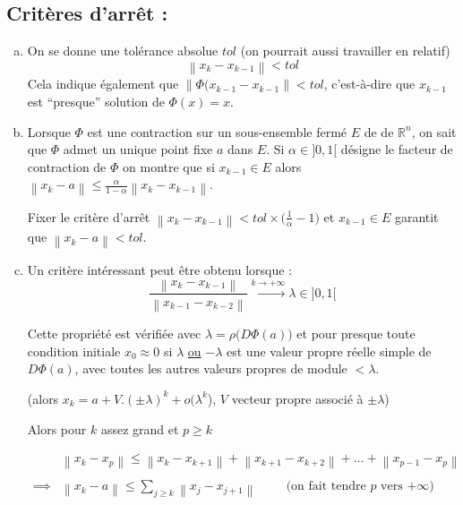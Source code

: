 \documentclass[a4paper,11pt]{article}
\newcommand{\R}{\mathbb{R}}
\newcommand{\norm}[1]{\left\lVert#1\right\rVert}
\theoremstyle{plain} %
\begin{document}
\subsection*{Critères d'arrêt :}
\begin{enumerate}[a)]
    \item
        On se donne une tolérance absolue $tol$ (on pourrait aussi travailler en relatif)
        \[
              \norm{x_k - x_{k-1}} < tol
        \]
        Cela indique également que $\norm{\Phi(x_{k-1} - x_{k-1}} < tol$,
        c'est-à-dire que $x_{k-1}$ est ``presque'' solution de $\Phi(x) = x$.
        
    \item Lorsque $\Phi$ est une contraction sur un sous-ensemble fermé $E$ de
          de $\R^n$, on sait que $\Phi$ admet un unique point fixe $a$ dans $E$.
          Si $\alpha \in ]0,1[$ désigne le facteur de contraction de $\Phi$ on
          montre que si $x_{k-1} \in E$ alors $\norm{x_k-a} \leq \frac{\alpha}{1-\alpha} \norm{x_k - x_{k-1}}$.
          
          Fixer le critère d'arrêt $\norm{x_k - x_{k-1}} < tol \times \big(\frac{1}{\alpha} - 1 \big)$ et $x_{k-1} \in E$ garantit que $\norm{x_k - a} < tol$.


    \item Un critère intéressant peut être obtenu lorsque :
        \[
        \frac{\norm{x_k - x_{k-1}}}{\norm{x_{k-1}-x_{k-2}}} \xrightarrow{k\to+\infty} \lambda \in ]0,1[ 
        \]

        Cette propriété est vérifiée avec $\lambda = \rho \big(D\Phi(a) \big)$ et pour
        presque toute condition initiale $x_0 \approx 0$ si $\lambda$ \underline{ou} $-\lambda$
        est une valeur propre réelle simple de $D\Phi(a)$, avec toutes les autres
        valeurs propres de module $< \lambda$.

        (alors $x_k = a + V.(\pm \lambda)^k + o(\lambda^k$), $V$ vecteur propre
        associé à $\pm \lambda$)

        Alors pour $k$ assez grand et $p \geq k$

        \begin{align*}
            & \norm{x_k - x_p} \leq \norm{x_k - x_{k+1}} + \norm{x_{k+1} - x_{k+2}}
            + \dots + \norm{x_{p-1}-x_p} \\ 
            \\
            \implies & \norm{x_k - a} \leq \sum_{j \geq k} \norm{x_j - x_{j+1}} \hspace{1cm} \text{(on fait tendre $p$ vers $+\infty$)}
        \end{align*}
        

\end{enumerate}
\end{document}
